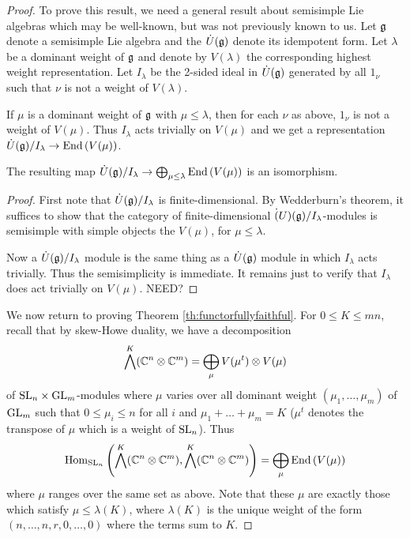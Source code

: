 \documentclass[10pt,leqno]{article}
\begin{document}
\begin{proof}
To prove this result, we need a general result about semisimple Lie algebras which may be well-known, but was not previously known to us. Let $ {\mathfrak{g}} $ denote a semisimple Lie algebra and the $\dot{U}({\mathfrak{g}})$ denote its idempotent form.  Let $ \lambda $ be a dominant weight of ${\mathfrak{g}}$ and denote by $V(\lambda)$ the corresponding highest weight representation. Let $ I_\lambda $ be the 2-sided ideal in $\dot{U}({\mathfrak{g}})$ generated by all $ 1_\nu $ such that $ \nu $ is not a weight of $V(\lambda)$.

If $ \mu $ is a dominant weight of $ {\mathfrak{g}} $ with $ \mu \le \lambda $, then for each $ \nu $ as above, $ 1_\nu $ is not a weight of $V(\mu)$.  Thus $ I_\lambda $ acts trivially on $ V(\mu) $ and we get a representation $ \dot{U}({\mathfrak{g}}) / I_\lambda \rightarrow \operatorname{End}\left(V(\mu)\right) $.

\begin{lem}
The resulting map $ \dot{U}({\mathfrak{g}}) / I_\lambda \rightarrow \bigoplus_{\mu \le \lambda} \operatorname{End}\left(V(\mu)\right)$ is an isomorphism.
\end{lem}
\begin{proof}
First note that $\dot{U}({\mathfrak{g}})/ I_\lambda $ is finite-dimensional.  By Wedderburn's theorem, it suffices to show that the category of finite-dimensional $\dot(U)({\mathfrak{g}})/I_\lambda$-modules is semisimple with simple objects the $V(\mu)$, for $\mu \le \lambda$.

Now a $\dot{U}({\mathfrak{g}})/I_\lambda$ module is the same thing as a $\dot{U}({\mathfrak{g}}) $ module in which $ I_\lambda $ acts trivially.  Thus the semisimplicity is immediate.  It remains just to verify that $ I_\lambda $ does act trivially on $V(\mu)$.
NEED?
\end{proof}

We now return to proving Theorem \ref{th:functorfullyfaithful}. For $ 0 \le K \le mn $, recall that by skew-Howe duality, we have a decomposition 
$$ \bigwedge^K (\mathbb C^n \otimes \mathbb C^m) = \bigoplus_{\mu} V(\mu^t) \otimes V(\mu) $$
of ${\rm{SL}}_n \times {\rm{GL}}_m$-modules where $\mu$ varies over all dominant weight $(\mu_1, \dots, \mu_m) $ of ${\rm{GL}}_m$ such that $ 0 \le \mu_i \le n $ for all $i$  and $ \mu_1 + \dots + \mu_m = K$ ($\mu^t$ denotes the transpose of $\mu$ which is a weight of ${\rm{SL}}_n$). Thus 
$$ \operatorname{Hom}_{{\rm{SL}}_n} \left(\bigwedge^K(\mathbb C^n \otimes \mathbb C^m), \bigwedge^K(\mathbb C^n \otimes \mathbb C^m)\right) = \bigoplus_{\mu} \operatorname{End}\left(V(\mu)\right) $$
where $ \mu $ ranges over the same set as above.  Note that these $\mu $ are exactly those which satisfy $ \mu \le \lambda(K) $, where $ \lambda(K) $ is the unique weight of the form $(n, \dots, n, r, 0, \dots, 0) $ where the terms sum to $K$. 


\end{proof}
\end{document}
